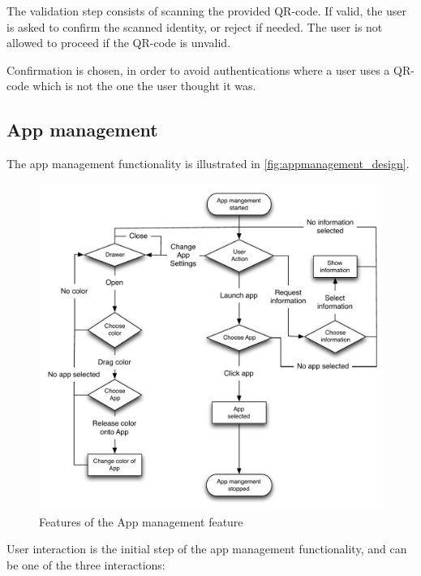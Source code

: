 The validation step consists of scanning the provided QR-code. If valid, the user is asked to confirm the scanned identity, or reject if needed. The user is not allowed to proceed if the QR-code is unvalid.

Confirmation is chosen, in order to avoid authentications where a user uses a QR-code which is not the one the user thought it was.


\subsection{App management}
\label{design:app_manangement}
The app management functionality is illustrated in \autoref{fig:appmanagement_design}. 
\begin{figure}[h]
	\centering
	\includegraphics[width=1\textwidth]{gfx/appmanagement.pdf}
	\caption{Features of the App management feature}
	\label{fig:appmanagement_design}
\end{figure}
User interaction is the initial step of the app management functionality, and can be one of the three interactions:

